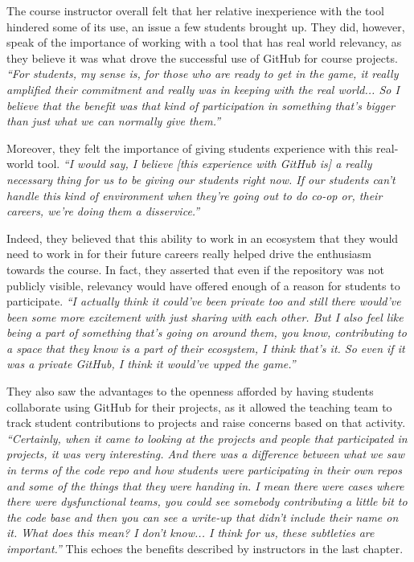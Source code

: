 The course instructor overall felt that her relative inexperience with the tool hindered some of its use, an issue a few students brought up. They did, however, speak of the importance of working with a tool that has real world relevancy, as they believe it was what drove the successful use of GitHub for course projects. \textit{``For students, my sense is, for those who are ready to get in the game, it really amplified their commitment and really was in keeping with the real world... So I believe that the benefit was that kind of participation in something that's bigger than just what we can normally give them.''}

Moreover, they felt the importance of giving students experience with this real-world tool. \textit{``I would say, I believe [this experience with GitHub is] a really necessary thing for us to be giving our students right now. If our students can't handle this kind of environment when they're going out to do co-op or, their careers, we're doing them a disservice.''}

Indeed, they believed that this ability to work in an ecosystem that they would need to work in for their future careers really helped drive the enthusiasm towards the course. In fact, they asserted that even if the repository was not publicly visible, relevancy would have offered enough of a reason for students to participate. \textit{``I actually think it could've been private too and still there would've been some more excitement with just sharing with each other. But I also feel like being a part of something that's going on around them, you know, contributing to a space that they know is a part of their ecosystem, I think that's it. So even if it was a private GitHub, I think it would've upped the game.''}


They also saw the advantages to the openness afforded by having students collaborate using GitHub for their projects, as it allowed the teaching team to track student contributions to projects and raise concerns based on that activity. \textit{``Certainly, when it came to looking at the projects and people that participated in projects, it was very interesting. And there was a difference between what we saw in terms of the code repo and how students were participating in their own repos and some of the things that they were handing in. I mean there were cases where there were dysfunctional teams, you could see somebody contributing a little bit to the code base and then you can see a write-up that didn't include their name on it. What does this mean? I don't know... I think for us, these subtleties are important.''}
This echoes the benefits described by instructors in the last chapter.

